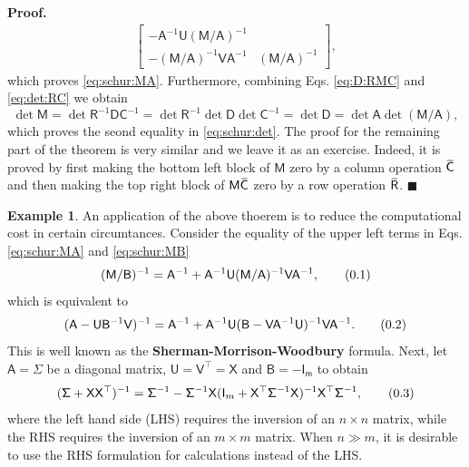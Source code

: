 \documentclass[10pt]{article}
\theoremstyle{definition}
\newtheorem{exmp}{Example}[section]
\newenvironment{prf}{\noindent\textbf{Proof.}}{\hfill$\blacksquare$}
\newcommand\eqnum{\addtocounter{equation}{1}\tag{\arabic{section}.\arabic{equation}}}
\newcommand{\overbar}[1]{\mkern 1.5mu\overline{\mkern-1.5mu#1\mkern-1.5mu}\mkern 1.5mu}
\begin{document}
\begin{prf}
\begin{align*}
\begin{bmatrix}
-\mathsf{A}^{-1}\mathsf{U}(\mathsf{M}/\mathsf{A})^{-1} \\
-(\mathsf{M}/\mathsf{A})^{-1}\mathsf{V}\mathsf{A}^{-1} & (\mathsf{M}/\mathsf{A})^{-1}
\end{bmatrix},
\end{align*}
which proves \cref{eq:schur:MA}. Furthermore, combining Eqs. \eqref{eq:D:RMC} and \eqref{eq:det:RC} we obtain
\begin{equation*}
\det\mathsf{M} = \det\mathsf{R}^{-1}\mathsf{D}\mathsf{C}^{-1} = \det\mathsf{R}^{-1} \det\mathsf{D} \det\mathsf{C}^{-1}
= \det\mathsf{D} = \det\mathsf{A}\det(\mathsf{M}/\mathsf{A}),
\end{equation*}
which proves the seond equality in \cref{eq:schur:det}. The proof for the remaining part of the theorem is very similar and we leave it as an exercise. Indeed, it is proved by first making the bottom left block of $\mathsf{M}$ zero by a column operation $\overbar{\mathsf{C}}$ and then making the top right block of $\mathsf{M}\overbar{\mathsf{C}}$ zero by a row operation $\overbar{\mathsf{R}}$.
\end{prf}
\begin{exmp}
An application of the above thoerem is to reduce the computational cost in certain circumtances. Consider the equality of the upper left terms in Eqs. \eqref{eq:schur:MA} and \eqref{eq:schur:MB}
\begin{equation*}
(\mathsf{M}/\mathsf{B})^{-1} = \mathsf{A}^{-1} + \mathsf{A}^{-1}\mathsf{U}(\mathsf{M}/\mathsf{A})^{-1}\mathsf{V}\mathsf{A}^{-1},
\eqnum
\end{equation*}
which is equivalent to
\begin{equation*}
(\mathsf{A} - \mathsf{U}\mathsf{B}^{-1}\mathsf{V})^{-1} = \mathsf{A}^{-1} + \mathsf{A}^{-1}\mathsf{U}(\mathsf{B}-\mathsf{V}\mathsf{A}^{-1}\mathsf{U})^{-1}\mathsf{V}\mathsf{A}^{-1}.
\eqnum
\label{eq:SMW:formula}
\end{equation*}
This is well known as the \textbf{Sherman-Morrison-Woodbury} formula. Next, let $\mathsf{A} = \mathsf{\Sigma}$ be a diagonal matrix, $\mathsf{U} = \mathsf{V}^{\top} = \mathsf{X}$ and $\mathsf{B} = -\mathsf{I_m}$ to obtain
\begin{equation*}
(\mathsf{\Sigma} + \mathsf{X}\mathsf{X}^{\top})^{-1} =
\mathsf{\Sigma}^{-1} - \mathsf{\Sigma}^{-1}\mathsf{X}(\mathsf{I}_m+\mathsf{X}^{\top}\mathsf{\Sigma}^{-1}\mathsf{X})^{-1}\mathsf{X}^{\top}\mathsf{\Sigma}^{-1},
\eqnum
\end{equation*}
where the left hand side (LHS) requires the inversion of an $n\times n$ matrix, while the RHS requires the inversion of an $m\times m$ matrix. When $n \gg m$, it is desirable to use the RHS formulation for calculations instead of the LHS. 
\end{exmp}
\end{document}
